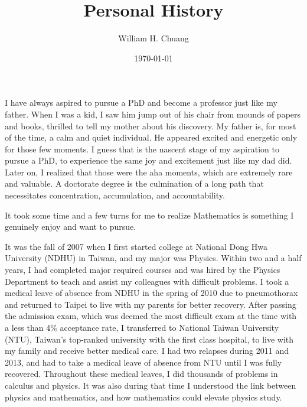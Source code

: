 \documentclass[11pt]{amsart}
\begin{document}
\title{Personal History}
\author{William H. Chuang}
\date{\today}
\maketitle



I have always aspired to pursue a PhD and become a professor just like my father. When I was a kid, I saw him jump out of his chair from mounds of papers and books, thrilled to tell my mother about his discovery. My father is, for most of the time, a calm and quiet individual. He appeared excited and energetic only for those few moments. I guess that is the nascent stage of my aspiration to pursue a PhD, to experience the same joy and excitement just like my dad did. Later on, I realized that those were the aha moments, which are extremely rare and valuable. A doctorate degree is the culmination of a long path that necessitates concentration, accumulation, and accountability. %



It took some time and a few turns for me to realize Mathematics is something I genuinely enjoy and want to pursue. 

It was the fall of 2007 when I first started college at National Dong Hwa University (NDHU) in Taiwan, and my major was Physics. Within two and a half years, I had completed major required courses and was hired by the Physics Department to teach and assist my colleagues with difficult problems. I took a medical leave of absence from NDHU in the spring of 2010 due to pneumothorax and returned to Taipei to live with my parents for better recovery. After passing the admission exam, which was deemed the most difficult exam at the time with a less than 4$\%$ acceptance rate, I transferred to National Taiwan University (NTU), Taiwan's top-ranked university with the first class hospital, to live with my family and receive better medical care. I had two relapses during 2011 and 2013, and had to take a medical leave of absence from NTU until I was fully recovered. Throughout these medical leaves, I did thousands of problems in calculus and physics. It was also during that time I understood the link between physics and mathematics, and how mathematics could elevate physics study.
\end{document}

